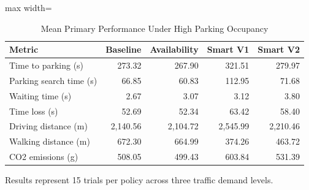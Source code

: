 \begin{table}[t]
\centering
\caption{Mean Primary Performance Under High Parking Occupancy}
\label{tab:high_occupancy_performance}
\small
\setlength{\tabcolsep}{4pt}
\begin{adjustbox}{max width=\textwidth}

\begin{tabular}{lrrrr}
\toprule
Metric & Baseline & Availability & Smart V1 & Smart V2\\
\midrule
Time to parking (s) & 273.32 & 267.90 & 321.51 & 279.97\\
Parking search time (s) & 66.85 & 60.83 & 112.95 & 71.68\\
Waiting time (s) & 2.67 & 3.07 & 3.12 & 3.80\\
Time loss (s) & 52.69 & 52.34 & 63.42 & 58.40\\
Driving distance (m) & 2,140.56 & 2,104.72 & 2,545.99 & 2,210.46\\
\addlinespace
Walking distance (m) & 672.30 & 664.99 & 374.26 & 463.72\\
CO2 emissions (g) & 508.05 & 499.43 & 603.84 & 531.39\\
\bottomrule
\end{tabular}
\end{adjustbox}
\par\smallskip
\begin{minipage}{\textwidth}
\footnotesize
Results represent 15 trials per policy across three traffic demand levels.
\end{minipage}
\end{table}
